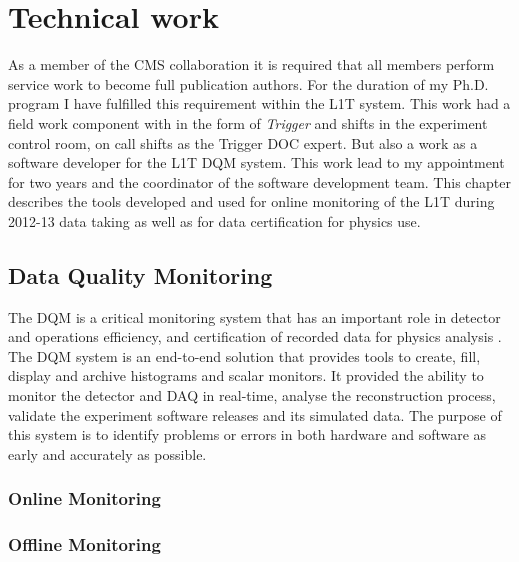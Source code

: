 \chapter{Technical work}
\label{CHAPTER:TechnicalWork}

\glsresetall %


As a member of the \gls{CMS} collaboration it is required that all members perform service work to become full publication authors. For the duration of my Ph.D. program I have fulfilled this requirement within the \gls{L1T} system. This work had a field work component with in the form of \textit{Trigger} and  shifts in the experiment control room, on call shifts as the Trigger \gls{DOC} expert. But also a work as a software developer for the \gls{L1T} \gls{DQM} system. This work lead to my appointment for two years and the coordinator of the software development team. This chapter describes the tools developed and used for online monitoring of the \gls{L1T} during 2012-13 data taking as well as for data certification for physics use.

\section{Data Quality Monitoring}


The \acrfull{DQM} is a critical monitoring system that has an important role in detector and operations efficiency, and certification of recorded data for physics analysis \cite{CMSTDR:CMSTridasTDRVol1,ARTICLE:CMSDataQualityMonitoringSoftWare_ExperienceAndFuture}. The \gls{DQM} system is an end-to-end solution that provides tools to create, fill, display and archive histograms and scalar monitors. It provided the ability to monitor the detector and \gls{DAQ} in real-time, analyse the reconstruction process, validate the experiment software releases and its simulated data. The purpose of this system is to identify problems or errors in both hardware and software as early and accurately as possible.

\subsection{Online Monitoring}




\subsection{Offline Monitoring}


